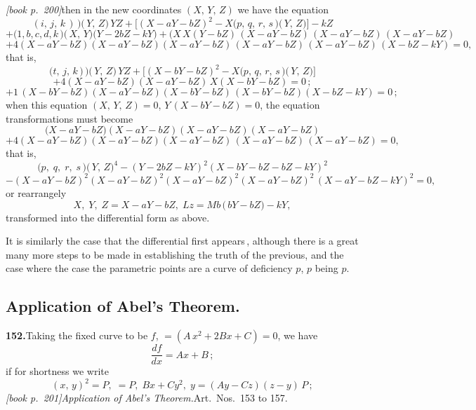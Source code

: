 \documentclass[11pt,a4paper]{article}
\begin{document}
\medskip\noindent\textit{[book p.~200]}\quad then in the new coordinates $(X,\,Y,\,Z)$ we have the equation
\[
(i,\,j,\,k\,)\!\,\mbox{$)\!($}\,Y,\,Z\bigr)\,Y Z + \bigl[(X - aY - bZ)^2 - X(p,\,q,\,r,\,s\!\,\mbox{$)\!($}\,Y,\,Z\bigr)\bigr] - kZ
\]
\[
+ (1, b, c, d, k\!\,\mbox{$)\!($}\,X,\,Y\bigr)(Y - 2bZ - kY\bigr) + (X\,X(Y - bZ)\,(X - aY - bZ)\,(X - aY - bZ)\,(X - aY - bZ)
\]
\[
+ 4(X - aY - bZ)(X - aY - bZ)(X - aY - bZ)\,(X - aY - bZ)\,(X - aY - bZ)\,(X - bZ - kY) = 0,
\]
that is,
\[
\bigl(t,\,j,\,k\,\bigr)\!\,\mbox{$)\!($}\,Y,\,Z\bigr)\,Y Z + \bigl[(X - bY - bZ)^2 - X(p,\,q,\,r,\,s\!\,\mbox{$)\!($}\,Y,\,Z\bigr)\bigr]
\]
\[
+ 4(X - aY - bZ)(X - aY - bZ)\,X(X - bY - bZ) = 0\,;
\]
\[
+ 1\,(X - bY - bZ)(X - aY - bZ)(X - bY - bZ)\,(X - bY - bZ)(X - bZ - kY) = 0\,;
\]
when this equation $(X,\,Y,\,Z) = 0$, $Y\,(X - bY - bZ) = 0$, the equation transformations must become
\[
\bigl(X - aY - bZ)(X - aY - bZ)(X - aY - bZ)(X - aY - bZ)
\]
\[
+ 4(X - aY - bZ)(X - aY - bZ)(X - aY - bZ)\,(X - aY - bZ)\,(X - aY - bZ) = 0,
\]
that is,
\[
\bigl(p,\;q,\;r,\;s\!\,\mbox{$)\!($}\,Y,\,Z\bigr)^4 - (Y - 2bZ - kY)^2(X - bY - bZ - bZ - kY)^2
\]
\[
- (X - aY - bZ)^2(X - aY - bZ)^2(X - aY - bZ)^2(X - aY - bZ)^2\,(X - aY - bZ - kY)^2 = 0,
\]
or rearrangely
\[
X,\;Y,\;Z = X - aY - bZ,\;Lz = M b\,(\,bY - bZ\bigr) - kY,
\]
transformed into the differential form as above.

It is similarly the case that the differential first appears\,, although there is a great many more steps to be made in establishing the truth of the previous, and the case where the case the parametric points are a curve of deficiency $p$, $p$ being $p$.

\subsection*{Application of Abel's Theorem.}

\medskip\noindent\textbf{152.}\quad Taking the fixed curve to be $f$, $= (A\,x^2 + 2Bx + C) = 0$, we have
\[
\frac{df}{dx} = Ax + B\,;
\]
if for shortness we write
\[
(x,\,y)^2 = P,\;= P,\;Bx + Cy^2,\;y = (Ay - Cz)(z - y)\,P\,;
\]
\medskip\noindent\textit{[book p.~201]}\quad \textit{Application of Abel's Theorem.}\quad Art.\ Nos.\ 153 to 157.
\end{document}

